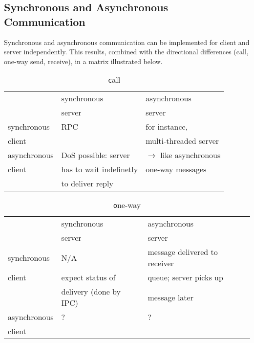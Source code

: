 \subsection{Synchronous and Asynchronous Communication}
Synchronous and asynchronous communication can be implemented for client
and server independently. This results, combined with the directional
differences (call, one-way send, receive), in a matrix illustrated below.

\begin{table}[ht]
 \begin{center}
  \begin{tabular}{|l|l|l|}
    \hline 
    & synchronous & asynchronous \\ 
    & server & server \\ 
    \hline
    synchronous  & RPC  & for instance,\\
    client       &      & multi-threaded server \\ 
    \hline
    asynchronous & DoS possible: server    & $\rightarrow$ like asynchronous \\
    client       & has to wait indefinetly & one-way messages \\
                 & to deliver reply        & \\
    \hline
  \end{tabular}
 \end{center}
 \caption{\texttt call}
 \label{table:sync-aync-call}
\end{table}

\begin{table}[ht]
 \begin{center}
  \begin{tabular}{|l|l|l|}
    \hline 
    & synchronous & asynchronous \\ 
    & server & server \\ 
    \hline
    synchronous  & N/A                    & message delivered to receiver \\
    client       & expect status of       & queue; server picks up \\ 
                 & delivery (done by IPC) & message later \\
    \hline
    asynchronous & ?                      & ?                               \\
    client       &                        & \\
    \hline
  \end{tabular}
 \end{center}
 \caption{\texttt one-way}
 \label{table:sync-aync-one-way}
\end{table}

